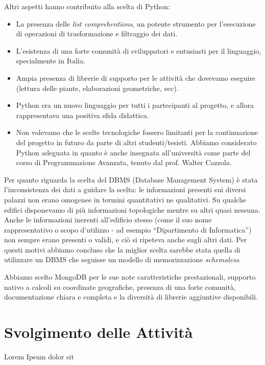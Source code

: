 \documentclass[12pt]{report}
\begin{document}
Altri aspetti hanno contribuito alla scelta di Python:
\begin{itemize}
  \item La presenza delle \textit{list comprehentions}, un potente strumento per l'esecuzione di operazioni di trasformazione e filtraggio dei dati.
  \item L'esistenza di una forte comunità di sviluppatori e entusiasti per il linguaggio, specialmente in Italia.
  \item Ampia presenza di librerie di supporto per le attività che dovevamo eseguire (lettura delle piante, elaborazioni geometriche, ecc).
  \item Python era un nuovo linguaggio per tutti i partecipanti al progetto, e allora rappresentava una positiva sfida didattica.
  \item Non volevamo che le scelte tecnologiche fossero limitanti per la continuazione del progetto in futuro da parte di altri studenti/tesisti. Abbiamo considerato Python adeguata in quanto è anche insegnata all'università come parte del corso di Programmazione Avanzata, tenuto dal prof. Walter Cazzola.
\end{itemize}

Per quanto riguarda la scelta del DBMS (Database Management System) è stata l'inconsistenza dei dati a guidare la scelta: le informazioni presenti sui diversi palazzi non erano omogenee in termini quantitativi ne qualitativi. Su qualche edifici disponevamo di più informazioni topologiche mentre su altri quasi nessuna. Anche le informazioni inerenti all'edificio stesso (come il suo nome rappresentativo o scopo d'utilizzo - ad esempio ``Dipartimento di Informatica'') non sempre erano presenti o validi, e ciò si ripeteva anche sugli altri dati. Per questi motivi abbiamo concluso che la miglior scelta sarebbe stata quella di utilizzare un DBMS che seguisse un modello di memorizzazione \textit{schemaless}. 

Abbiamo scelto MongoDB per le sue note caratteristiche prestazionali, supporto nativo a calcoli su coordinate geografiche, presenza di una forte comunità, documentazione chiara e completa e la diversità di librerie aggiuntive disponibili.




% 
% 
\chapter{Svolgimento delle Attività}
\label{cap3}
Lorem Ipsum dolor sit
\end{document}
